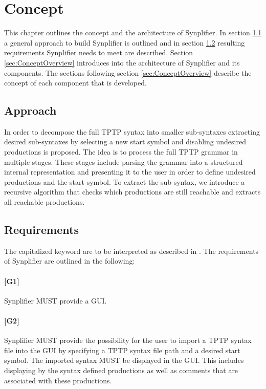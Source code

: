 
\chapter{Concept}\label{cha:Concept}
This chapter outlines the concept and the architecture of \ac{Synplifier}. In section \ref{sec:ConceptApproach} a general approach to build \ac{Synplifier} is outlined and in section \ref{sec:ConceptRequirements} resulting requirements \ac{Synplifier} needs to meet are described.
Section \ref{sec:ConceptOverview} introduces into the architecture of \ac{Synplifier} and its components.
The sections following section \ref{sec:ConceptOverview} describe the concept of each component that is developed.

\section{Approach}\label{sec:ConceptApproach}

In order to decompose the full \ac{TPTP} syntax into smaller sub-syntaxes extracting desired sub-syntaxes by selecting a new start symbol and disabling undesired productions is proposed.
The idea is to process the full \ac{TPTP} grammar in multiple stages.
These stages include parsing the grammar into a structured internal representation and presenting it to the user in order to define undesired productions and the start symbol. To extract the sub-syntax, we introduce a recursive algorithm that checks which productions are still reachable and extracts all reachable
productions.

\section{Requirements}\label{sec:ConceptRequirements}

The capitalized keyword are to be interpreted as described in \cite{Bradner.1997}.
The requirements of \ac{Synplifier} are outlined in the following:\\
\subsubsection{[G1]}\label{G1}
\ac{Synplifier} MUST provide a GUI.
\subsubsection{[G2]}\label{G2}
\ac{Synplifier} MUST provide the possibility for the user to import a \ac{TPTP} syntax file into the GUI by specifying a \ac{TPTP} syntax file path and a desired start symbol. The imported syntax MUST be displayed in the GUI. This includes displaying by the syntax defined productions as well as comments that are associated with these productions.
